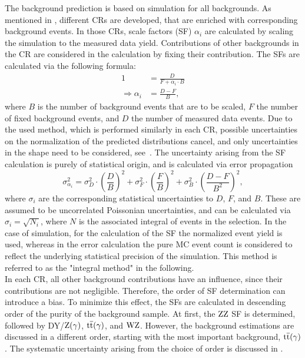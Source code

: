 The background prediction is based on simulation for all backgrounds. As mentioned in , different CRs are developed, that are enriched with corresponding background events. In those CRs, scale factors (SF) $\alpha_i$ are calculated by scaling the simulation to the measured data yield. Contributions of other backgrounds in the CR are considered in the calculation by fixing their contribution. The SFs are calculated via the following formula:
\begin{align}
 1                        & = \frac{D}{F+\alpha_i\cdot B} \\
 \Longrightarrow \alpha_i & = \frac{D-F}{B},              
\end{align}
where $B$ is the number of background events that are to be scaled, $F$ the number of fixed background events, and $D$ the number of measured data events.
Due to the used method, which is performed similarly in each CR, possible uncertainties on the normalization of the predicted distributions cancel, and only uncertainties in the shape need to be considered, see~. The uncertainty arising from the SF calculation is purely of statistical origin, and is calculated via error propagation
\begin{equation}
 \sigma_{\alpha_i}^2 = \sigma_{D}^2 \cdot \left(\frac{D}{B}\right)^2 + \sigma_{F}^2 \cdot \left(\frac{F}{B}\right)^2 + \sigma_{B}^2 \cdot \left(\frac{D-F}{B^2}\right)^2,
\end{equation}
where $\sigma_i$ are the corresponding statistical uncertainties to $D$, $F$, and $B$. These are assumed to be uncorrelated Poissonian uncertainties, and can be calculated via $\sigma_i=\sqrt{N_i}$, where $N$ is the associated integral of events in the selection. In the case of simulation, for the calculation of the SF the normalized event yield is used, whereas in the error calculation the pure MC event count is considered to reflect the underlying statistical precision of the simulation. This method is referred to as the "integral method" in the following.\\
In each CR, all other background contributions have an influence, since their contributions are not negligible. Therefore, the order of SF determination can introduce a bias. To minimize this effect, the SFs are calculated in descending order of the purity of the background sample. At first, the $\mathrm{Z}\mathrm{Z}$ SF is determined, followed by DY/$\mathrm{Z}(\gamma)$, ${\mathrm{t}\overline{\mathrm{t}}}(\gamma)$, and $\mathrm{W}\mathrm{Z}$. However, the background estimations are discussed in a different order, starting with the most important background, ${\mathrm{t}\overline{\mathrm{t}}}(\gamma)$. The systematic uncertainty arising from the choice of order is discussed in .\\
